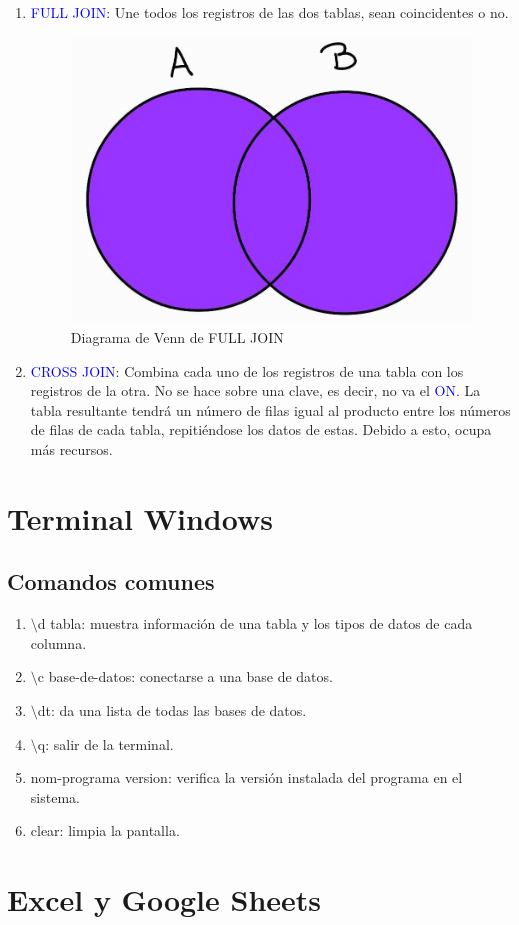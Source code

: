 \documentclass[a4paper, 12pt]{book}
\begin{document}
\begin{enumerate}
\item \textcolor{blue}{FULL JOIN}: Une todos los registros de las dos tablas, sean coincidentes o no.
\begin{figure}[H] 
\centering 
\includegraphics[width=0.4\linewidth]{fulljoin.jpg}
\caption{Diagrama de Venn de FULL JOIN}
\end{figure}
\item \textcolor{blue}{CROSS JOIN}: Combina cada uno de los registros de una tabla con los registros de la otra. No se hace sobre una clave, es decir, no va el \textcolor{blue}{ON}. La tabla resultante tendrá un número de filas igual al producto entre los números de filas de cada tabla, repitiéndose los datos de estas. Debido a esto, ocupa más recursos.
\end{enumerate}
%
\chapter{Terminal Windows}
\section{Comandos comunes}
\begin{enumerate}
	\item $\setminus$d tabla: muestra información de una tabla y los tipos de datos de cada columna.
	\item $\setminus$c base-de-datos: conectarse a una base de datos.
	\item $\setminus$dt: da una lista de todas las bases de datos.
    \item $\setminus$q: salir de la terminal.
    \item nom-programa version: verifica la versión instalada del programa en el sistema.
    \item clear: limpia la pantalla.
\end{enumerate}
%
\chapter{Excel y Google Sheets}
\end{document}
